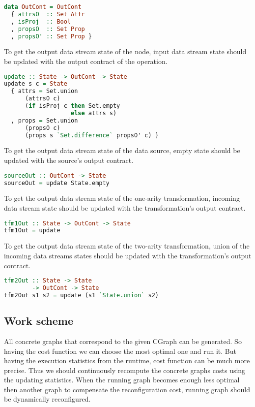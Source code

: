 \begin{lstlisting}[language=Haskell]
data OutCont = OutCont
  { attrsO  :: Set Attr
  , isProj  :: Bool
  , propsO  :: Set Prop
  , propsO' :: Set Prop }
\end{lstlisting}

To get the output data stream state of the node, input data stream state should be updated with the output contract of the operation.

\begin{lstlisting}[language=Haskell]
update :: State -> OutCont -> State
update s c = State
  { attrs = Set.union
      (attrsO c)
      (if isProj c then Set.empty
                   else attrs s)
  , props = Set.union
      (propsO c)
      (props s `Set.difference` propsO' c) }
\end{lstlisting}

To get the output data stream state of the data source, empty state should be updated with the source's output contract.

\begin{lstlisting}[language=Haskell]
sourceOut :: OutCont -> State
sourceOut = update State.empty
\end{lstlisting}

To get the output data stream state of the one-arity transformation, incoming data stream state should be updated with the transformation's output contract.

\begin{lstlisting}[language=Haskell]
tfm1Out :: State -> OutCont -> State
tfm1Out = update
\end{lstlisting}

To get the output data stream state of the two-arity transformation, union of the incoming data streams states should be updated with the transformation's output contract.

\begin{lstlisting}[language=Haskell]
tfm2Out :: State -> State
        -> OutCont -> State
tfm2Out s1 s2 = update (s1 `State.union` s2)
\end{lstlisting}

\subsection{Work scheme}

All concrete graphs that correspond to the given CGraph can be generated.
So having the cost function we can choose the most optimal one and run it.
But having the execution statistics from the runtime, cost function can be much more precise.
Thus we should continuously recompute the concrete graphs costs using the updating statistics.
When the running graph becomes enough less optimal then another graph to compensate the reconfiguration cost, running graph should be dynamically reconfigured.

